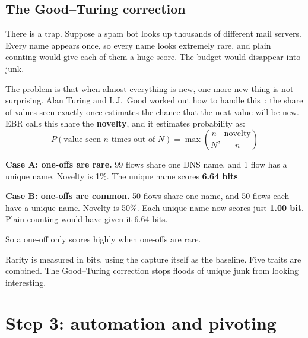 \section{The Good--Turing correction}
There is a trap. Suppose a spam bot looks up thousands of different mail servers. Every name appears once, so every name looks extremely rare, and plain counting would give each of them a huge score. The budget would disappear into junk.

The problem is that when almost everything is new, one more new thing is not surprising. Alan Turing and I.\,J.\ Good worked out how to handle this~\cite{good}: the share of values seen exactly once estimates the chance that the next value will be new. EBR calls this share the \textbf{novelty}, and it estimates probability as:
\[
P(\text{value seen } n \text{ times out of } N) = \max\!\left(\frac{n}{N},\ \frac{\text{novelty}}{n}\right)
\]

\begin{example}
\textbf{Case A: one-offs are rare.} 99 flows share one DNS name, and 1 flow has a unique name. Novelty is 1\%. The unique name scores \textbf{6.64 bits}.

\textbf{Case B: one-offs are common.} 50 flows share one name, and 50 flows each have a unique name. Novelty is 50\%. Each unique name now scores just \textbf{1.00 bit}. Plain counting would have given it 6.64 bits.

So a one-off only scores highly when one-offs are rare.
\end{example}

\begin{recap}
Rarity is measured in bits, using the capture itself as the baseline. Five traits are combined. The Good--Turing correction stops floods of unique junk from looking interesting.
\end{recap}

\chapter{Step 3: automation and pivoting}
\label{ch:auto}

